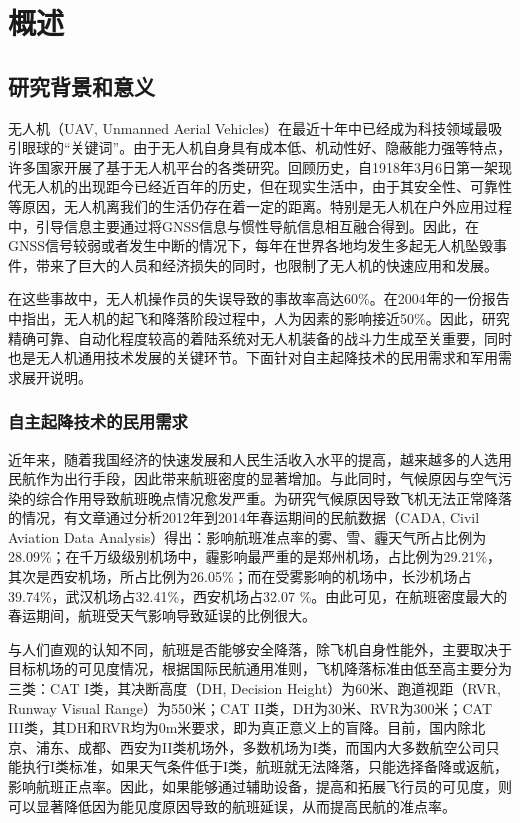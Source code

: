 \chapter{概述}


\section{研究背景和意义}
无人机（UAV, Unmanned Aerial Vehicles）在最近十年中已经成为科技领域最吸引眼球的“关键词”。由于无人机自身具有成本低、机动性好、隐蔽能力强等特点，许多国家开展了基于无人机平台的各类研究。回顾历史，自1918年3月6日第一架现代无人机的出现距今已经近百年的历史，但在现实生活中，由于其安全性、可靠性等原因，无人机离我们的生活仍存在着一定的距离。特别是无人机在户外应用过程中，引导信息主要通过将GNSS信息与惯性导航信息相互融合得到。因此，在GNSS信号较弱或者发生中断的情况下，每年在世界各地均发生多起无人机坠毁事件，带来了巨大的人员和经济损失的同时，也限制了无人机的快速应用和发展。

在这些事故中，无人机操作员的失误导致的事故率高达60\%\cite{arrabito2010human}。在2004年的一份报告中指出\cite{williams2004summary}，无人机的起飞和降落阶段过程中，人为因素的影响接近50\%。因此，研究精确可靠、自动化程度较高的着陆系统对无人机装备的战斗力生成至关重要，同时也是无人机通用技术发展的关键环节。下面针对自主起降技术的民用需求和军用需求展开说明。

\subsection{自主起降技术的民用需求}
近年来，随着我国经济的快速发展和人民生活收入水平的提高，越来越多的人选用民航作为出行手段，因此带来航班密度的显著增加。与此同时，气候原因与空气污染的综合作用导致航班晚点情况愈发严重。为研究气候原因导致飞机无法正常降落的情况，有文章\cite{BigDataLanding}通过分析2012年到2014年春运期间的民航数据（CADA, Civil Aviation Data Analysis）得出：影响航班准点率的雾、雪、霾天气所占比例为28.09\%；在千万级级别机场中，霾影响最严重的是郑州机场，占比例为29.21\%，其次是西安机场，所占比例为26.05\%；而在受雾影响的机场中，长沙机场占39.74\%，武汉机场占32.41\%，西安机场占32.07 \%。由此可见，在航班密度最大的春运期间，航班受天气影响导致延误的比例很大。

与人们直观的认知不同，航班是否能够安全降落，除飞机自身性能外，主要取决于目标机场的可见度情况，根据国际民航通用准则，飞机降落标准由低至高主要分为三类：CAT I类，其决断高度（DH, Decision Height）为60米、跑道视距（RVR, Runway Visual Range）为550米；CAT II类，DH为30米、RVR为300米；CAT III类，其DH和RVR均为0m米要求，即为真正意义上的盲降。目前，国内除北京、浦东、成都、西安为II类机场外，多数机场为I类，而国内大多数航空公司只能执行I类标准，如果天气条件低于I类，航班就无法降落，只能选择备降或返航，影响航班正点率。因此，如果能够通过辅助设备，提高和拓展飞行员的可见度，则可以显著降低因为能见度原因导致的航班延误，从而提高民航的准点率。

